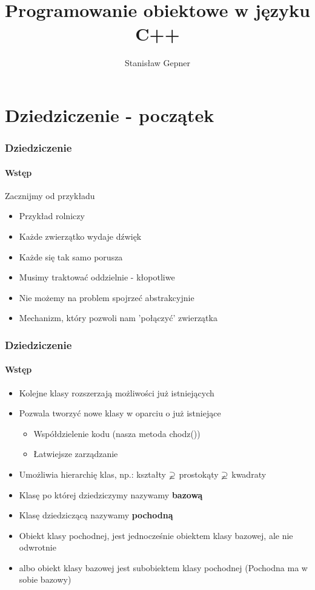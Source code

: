 \documentclass[10pt]{beamer}
\title{Programowanie obiektowe w języku C++}
\author[shortname]{Stanis{\l}aw Gepner}
\institute[shortinst]{sgepner@meil.pw.edu.pl}
\date{}
\begin{document}
\frame{
    \titlepage
}

\section{Dziedziczenie - początek}

\begin{frame}
  \frametitle{Dziedziczenie}
  \framesubtitle{Wstęp}

	\centering
	Zacznijmy od przykładu  
  
  \begin{itemize}
    \item Przykład rolniczy
    \item Każde zwierzątko wydaje dźwięk
    \item Każde się tak samo porusza
    \item Musimy traktować oddzielnie - kłopotliwe
    \item Nie możemy na problem spojrzeć abstrakcyjnie
		\item Mechanizm, który pozwoli nam 'połączyć' zwierzątka
  \end{itemize}
\end{frame}

\begin{frame}
  \frametitle{Dziedziczenie}
  \framesubtitle{Wstęp}
  	\begin{itemize}
	    \item Kolejne klasy rozszerzają możliwości już istniejących
	    \item Pozwala tworzyć nowe klasy w oparciu o już istniejące
	    \begin{itemize}
	    	\item Współdzielenie kodu (nasza metoda chodz())
	    	\item Łatwiejsze zarządzanie
	    \end{itemize}
	    \item Umożliwia hierarchię klas, np.: kształty $\varsupsetneq$ prostokąty $\varsupsetneq$ kwadraty
	    \item Klasę po której dziedziczymy nazywamy \textbf{bazową}
	    \item Klasę dziedziczącą nazywamy \textbf{pochodną}
	    \item Obiekt klasy pochodnej, jest jednocześnie obiektem klasy bazowej, ale nie odwrotnie
	    \item albo obiekt klasy bazowej jest subobiektem klasy pochodnej (Pochodna ma w sobie bazowy) 
  \end{itemize}
\end{frame}
\end{document}
